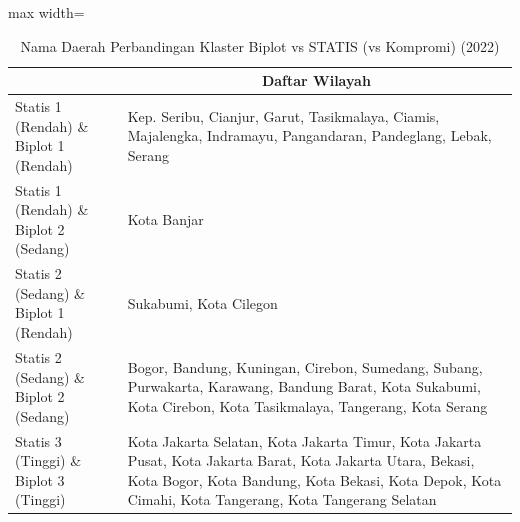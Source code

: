 \begin{table}[H]
\centering
\caption{Nama Daerah Perbandingan Klaster Biplot vs STATIS (vs Kompromi) (2022)} \label{tab:app2biplot_statis_name_2022}
\begin{adjustbox}{max width=\textwidth}
\begin{tabular}{|>{\centering\arraybackslash}p{4cm}|p{10cm}|}
\hline
\multicolumn{1}{|c|}{\textbf{Kategori}} & \multicolumn{1}{c|}{\textbf{Daftar Wilayah}} \\
\hline
Statis 1 (Rendah) \& Biplot 1 (Rendah) & Kep. Seribu, Cianjur, Garut, Tasikmalaya, Ciamis, Majalengka, Indramayu, Pangandaran, Pandeglang, Lebak, Serang \\
\hline
Statis 1 (Rendah) \& Biplot 2 (Sedang) & Kota Banjar \\
\hline
Statis 2 (Sedang) \& Biplot 1 (Rendah) & Sukabumi, Kota Cilegon \\
\hline
Statis 2 (Sedang) \& Biplot 2 (Sedang) & Bogor, Bandung, Kuningan, Cirebon, Sumedang, Subang, Purwakarta, Karawang, Bandung Barat, Kota Sukabumi, Kota Cirebon, Kota Tasikmalaya, Tangerang, Kota Serang \\
\hline
Statis 3 (Tinggi) \& Biplot 3 (Tinggi) & Kota Jakarta Selatan, Kota Jakarta Timur, Kota Jakarta Pusat, Kota Jakarta Barat, Kota Jakarta Utara, Bekasi, Kota Bogor, Kota Bandung, Kota Bekasi, Kota Depok, Kota Cimahi, Kota Tangerang, Kota Tangerang Selatan \\
\hline
\end{tabular}
\end{adjustbox}
\end{table}